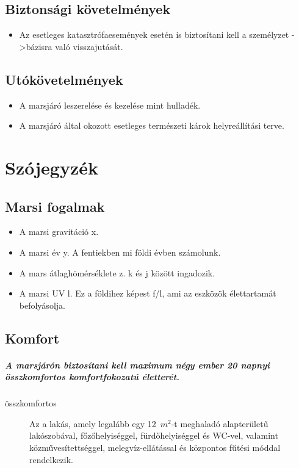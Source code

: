 \documentclass{report}
\begin{document}
\section{Biztonsági követelmények}
\begin{itemize}
  \item Az esetleges katasztrófaesemények esetén is biztosítani kell a személyzet ->bázisra való visszajutását.
\end{itemize}
\section{Utókövetelmények}
\begin{itemize}
  \item A marsjáró leszerelése és kezelése mint hulladék.
  \item A marsjáró által okozott esetleges természeti károk helyreállítási terve.
\end{itemize}

\chapter{Szójegyzék}
\section{Marsi fogalmak}
\begin{itemize}
  \item A marsi gravitáció x.
  \item A marsi év y. A fentiekben mi földi évben számolunk.
  \item A mars átlaghömérséklete z. k és j között ingadozik.
  \item A marsi UV l. Ez a földihez képest f/l, ami az eszközök élettartamát befolyásolja.
\end{itemize}


\section{Komfort}

\paragraph{A marsjárón biztosítani kell maximum négy ember 20 napnyi összkomfortos komfortfokozatú életterét.}

\begin{description}
\item[összkomfortos] Az a lakás, amely legalább egy 12 $m^2$-t meghaladó alapterületű lakószobával, főzőhelyiséggel, fürdőhelyiséggel és WC-vel, valamint közművesítettséggel, melegvíz-ellátással és központos fűtési móddal rendelkezik. 
\end{description}
\end{document}
